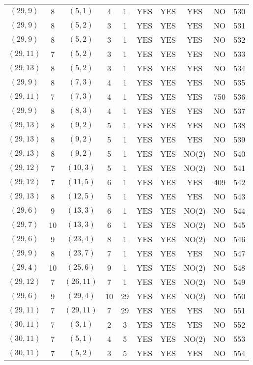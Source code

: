 \begin{longtable}{|c|c|c|c|c|c|c|c|c|c|}
$(29, 9)$ & 8 & $(5, 1)$ & 4 & 1 & YES & YES & YES & NO & 530\\
$(29, 9)$ & 8 & $(5, 2)$ & 3 & 1 & YES & YES & YES & NO & 531\\
$(29, 9)$ & 8 & $(5, 2)$ & 3 & 1 & YES & YES & YES & NO & 532\\
$(29, 11)$ & 7 & $(5, 2)$ & 3 & 1 & YES & YES & YES & NO & 533\\
$(29, 13)$ & 8 & $(5, 2)$ & 3 & 1 & YES & YES & YES & NO & 534\\
$(29, 9)$ & 8 & $(7, 3)$ & 4 & 1 & YES & YES & YES & NO & 535\\
$(29, 11)$ & 7 & $(7, 3)$ & 4 & 1 & YES & YES & YES & 750 & 536\\
$(29, 9)$ & 8 & $(8, 3)$ & 4 & 1 & YES & YES & YES & NO & 537\\
$(29, 13)$ & 8 & $(9, 2)$ & 5 & 1 & YES & YES & YES & NO & 538\\
$(29, 13)$ & 8 & $(9, 2)$ & 5 & 1 & YES & YES & YES & NO & 539\\
$(29, 13)$ & 8 & $(9, 2)$ & 5 & 1 & YES & YES & NO(2) & NO & 540\\
$(29, 12)$ & 7 & $(10, 3)$ & 5 & 1 & YES & YES & NO(2) & NO & 541\\
$(29, 12)$ & 7 & $(11, 5)$ & 6 & 1 & YES & YES & YES & 409 & 542\\
$(29, 13)$ & 8 & $(12, 5)$ & 5 & 1 & YES & YES & YES & NO & 543\\
$(29, 6)$ & 9 & $(13, 3)$ & 6 & 1 & YES & YES & NO(2) & NO & 544\\
$(29, 7)$ & 10 & $(13, 3)$ & 6 & 1 & YES & YES & NO(2) & NO & 545\\
$(29, 6)$ & 9 & $(23, 4)$ & 8 & 1 & YES & YES & NO(2) & NO & 546\\
$(29, 9)$ & 8 & $(23, 7)$ & 7 & 1 & YES & YES & YES & NO & 547\\
$(29, 4)$ & 10 & $(25, 6)$ & 9 & 1 & YES & YES & NO(2) & NO & 548\\
$(29, 12)$ & 7 & $(26, 11)$ & 7 & 1 & YES & YES & NO(2) & NO & 549\\
$(29, 6)$ & 9 & $(29, 4)$ & 10 & 29 & YES & YES & NO(2) & NO & 550\\
$(29, 11)$ & 7 & $(29, 11)$ & 7 & 29 & YES & YES & YES & NO & 551\\
$(30, 11)$ & 7 & $(3, 1)$ & 2 & 3 & YES & YES & YES & NO & 552\\
$(30, 11)$ & 7 & $(5, 1)$ & 4 & 5 & YES & YES & NO(2) & NO & 553\\
$(30, 11)$ & 7 & $(5, 2)$ & 3 & 5 & YES & YES & YES & NO & 554\\

\end{longtable}

